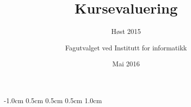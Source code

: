 \documentclass[norsk,a4paper,11pt]{report}
\author{Fagutvalget ved Institutt for informatikk}
\title{Kursevaluering}
\subtitle{Høst 2015}
\date{Mai 2016}
\begin{document}
\ififorside{}

\setlength{\topmargin}		{-1.0cm}
\setlength{\headsep}		{0.5cm}
\setlength{\oddsidemargin}	{0.5cm}
\setlength{\evensidemargin}	{0.5cm}
\setlength{\footskip}		{1.0cm}

%

%
\end{document}
